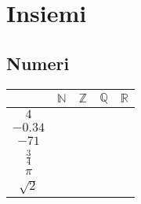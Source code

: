\section{Insiemi}
\subsection{Numeri}
\begin{questions}

\question


\begin{minipage}{\linewidth}
	\begin{multicols}{2}
		\begin{tabular}{|c|c|c|c|c|}
			\hline
			& $ \mathbb{N}$ & $ \mathbb{Z}  $ & $ \mathbb{Q}$ & $ \mathbb{R} $ \\
			\hline
			$ 4 $      &      \solonly{\checkmark }         &  \solonly{\checkmark }                &    \solonly{\checkmark }            &    \solonly{\checkmark }             \\
			\hline
			$ -0.34 $    &               &                 &    \solonly{\checkmark }            &      \solonly{\checkmark }           \\
			\hline
			$ -71 $     &               &      \solonly{\checkmark }            &    \solonly{\checkmark }            &   \solonly{\checkmark }              \\
			\hline
			$ \frac{3}{4} $ &               &                 &     \solonly{\checkmark }           &        \solonly{\checkmark }         \\
			\hline
			$ \pi $     &               &                 &               &    \solonly{\checkmark }             \\
			\hline
			$ \sqrt{2} $   &               &                 &               &    \solonly{\checkmark }             \\
			\hline
		\end{tabular}
		

\end{multicols}
\end{minipage}
\end{questions}
